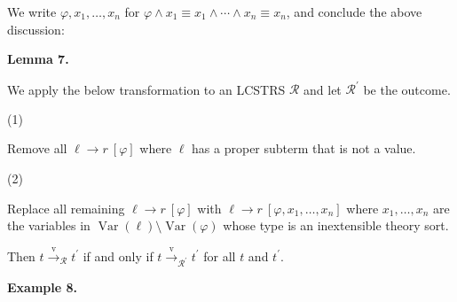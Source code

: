  
 
We write $\varphi,{x}_{1},\ldots,{x}_{n}$ for $\varphi\wedge x_{1}\equiv x_{1}\wedge\cdots\wedge x_{n}\equiv x_{n}$, and conclude the above discussion:\par
 
 
 
\par\medskip\noindent\textbf{Lemma 7.}\par
 
 
We apply the below transformation to an LCSTRS $\mathcal{R}$ and let $\mathcal{R}^{\prime}$ be the outcome.\par
  
\par\noindent  (1) 
 
Remove all ${\ell}\rightarrow{r}\ [\varphi]$ where $\ell$ has a proper subterm that is not a value.\par
 
 
 
\par\noindent  (2) 
 
Replace all remaining ${\ell}\rightarrow{r}\ [\varphi]$ with ${\ell}\rightarrow{r}\ [\varphi,{x}_{1},\ldots,{x}_{n}]$ where ${x}_{1},\ldots,{x}_{n}$ are the variables in $\operatorname{Var}(\ell)\setminus\operatorname{Var}(\varphi)$ whose type is an inextensible theory sort.\par
 
 
  
Then $t\xrightarrow{\scriptscriptstyle\mathrm{v}}_{\mathcal{R}}t^{\prime}$ if and only if $t\xrightarrow{\scriptscriptstyle\mathrm{v}}_{\mathcal{R}^{\prime}}t^{\prime}$ for all $t$ and $t^{\prime}$.\par
 
 
 
 
\par\medskip\noindent\textbf{Example 8.}\par
 
 
